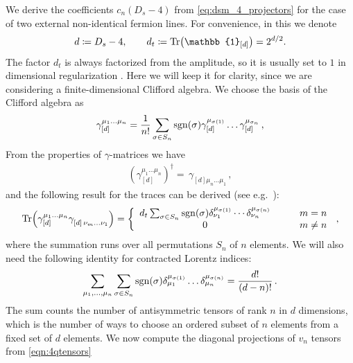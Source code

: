 We derive the coefficients $c_n(D_s-4)$ from \cref{eq:dsm_4_projectors} for
the case of two external non-identical fermion lines.
For convenience, in this  we denote
\begin{equation}
  d \coloneqq D_s-4, \qquad  d_t \coloneqq \Tr(\mathbb{1}_{[d]})=2^{d/2}.
\end{equation}
The factor $d_t$ is always factorized from the amplitude, so it is usually set to $1$ in dimensional regularization \cite{Collins:1984xc}.
Here we will keep it for clarity, since we are considering a finite-dimensional Clifford algebra.
We choose the basis of the Clifford algebra as
\begin{align}\label{eq:basisGammaChainII}
\gamma_{[d]}^{\mu_1 \ldots \mu_n} = \frac{1}{n!} \sum_{ \sigma\in
S_n} \operatorname{sgn}(\sigma) \gamma_{[d]}^{\mu_{\sigma(1)}} \ldots
\gamma_{[d]}^{\mu_{\sigma_n}}\,,
\end{align}
From the properties of $\gamma$-matrices we have
\begin{eqnarray}
  (\gamma_{[d]}^{\mu_1 \ldots \mu_n} )^\dagger =\,
  \gamma_{[d]\mu_n \ldots \mu_1}^{\phantom{\mu}} \,,
\end{eqnarray}
and the following result for the traces can be derived (see e.g.\ \cite{Veltman:1988au}):
\begin{eqnarray}
  \label{eq:traceChain}
  \Tr(\gamma_{[d]}^{\mu_1 \ldots \mu_n} \gamma^{
    \phantom{\mu}}_{[d]\,\nu_m \ldots \nu_1})= 
    \left\{ \begin{array}{cc} d_t 
      \sum_{ \sigma\in  S_n} \operatorname{sgn}(\sigma)
      \delta^{\mu_{\sigma(1)}}_{\nu_1}\cdots\delta^{\mu_{\sigma(n)}}_
      {\nu_n} &\qquad m=n   \\
      0 &\qquad m\neq n\end{array}  
    \right. 
    \,,
  \end{eqnarray}
%
where the summation runs over all permutations $S_n$ of $n$ elements.
We will also need the following identity for contracted Lorentz indices:
\begin{eqnarray}
  \label{eqn:simpletrace}
  \sum_{\mu_1,\ldots,\mu_n} 
  \sum_{ \sigma\in  S_n} \operatorname{sgn}(\sigma)
  \delta^{\mu_{\sigma(1)}}_{\mu_1}\ldots
  \delta^{\mu_{\sigma(n)}}_{\mu_n}
  = \frac{d!}{(d-n)! }\,.
\end{eqnarray}
The sum counts the number of antisymmetric tensors of
rank $n$ in $d$ dimensions, which is the number of ways to 
choose an ordered subset of $n$ elements from a fixed set of $d$
elements.
%
We now compute the diagonal projections of $v_n$ tensors from \cref{eqn:4qtensors}
